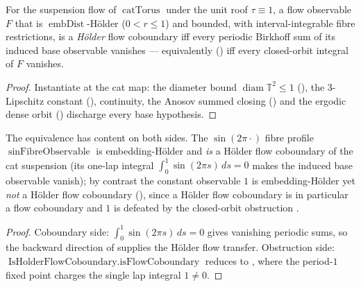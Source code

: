 \begin{theorem}\label{livsic_catSuspensionHolderFlow}
  \leanok
  For the suspension flow of \(\operatorname{catTorus}\) under the unit roof \(\tau\equiv 1\), a flow
  observable \(F\) that is \(\operatorname{embDist}\)-Hölder (\(0 < r\le 1\)) and bounded, with
  interval-integrable fibre restrictions, is a \emph{Hölder} flow coboundary iff every periodic
  Birkhoff sum of its induced base observable vanishes --- equivalently
  () iff every closed-orbit
  integral of \(F\) vanishes.
\end{theorem}
\begin{proof}\leanok
  Instantiate  at the cat map: the diameter bound
  \(\operatorname{diam}\mathbb{T}^2\le 1\) (), the
  \(3\)-Lipschitz constant (), continuity, the
  Anosov summed closing () and the ergodic dense orbit
  () discharge every base hypothesis.
\end{proof}

\begin{theorem}\label{isHolderFlowCoboundary_sinFibreObservable}
  \leanok
  The equivalence has content on both sides. The \(\sin(2\pi\cdot)\) fibre profile
  \(\operatorname{sinFibreObservable}\) is embedding-Hölder and \emph{is} a Hölder flow coboundary of
  the cat suspension (its one-lap integral \(\int_0^{1}\sin(2\pi s)\,ds = 0\) makes the induced base
  observable vanish); by contrast the constant observable \(1\) is embedding-Hölder yet \emph{not} a
  Hölder flow coboundary
  (), since a Hölder
  flow coboundary is in particular a flow coboundary and \(1\) is defeated by the closed-orbit
  obstruction .
\end{theorem}
\begin{proof}\leanok
  Coboundary side: \(\int_0^1\sin(2\pi s)\,ds = 0\) gives vanishing periodic sums, so the backward
  direction of  supplies the Hölder flow transfer. Obstruction
  side: \(\operatorname{IsHolderFlowCoboundary.isFlowCoboundary}\) reduces to
  , where the period-\(1\) fixed point charges the single lap integral
  \(1\ne 0\).
\end{proof}

